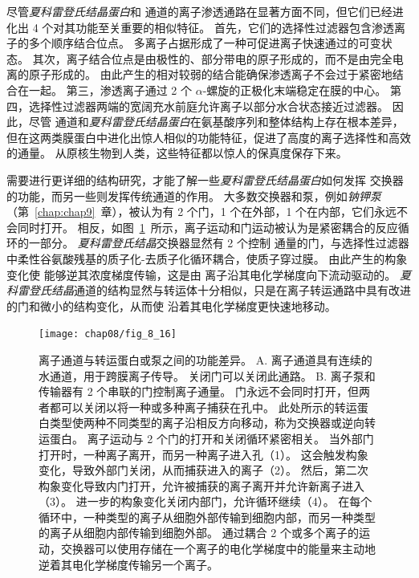 尽管\textit{夏科雷登氏结晶蛋白}和  通道的离子渗透通路在显著方面不同，但它们已经进化出 4 个对其功能至关重要的相似特征。
首先，它们的选择性过滤器包含渗透离子的多个顺序结合位点。
多离子占据形成了一种可促进离子快速通过的可变状态。
其次，离子结合位点是由极性的、部分带电的原子形成的，而不是由完全电离的原子形成的。
由此产生的相对较弱的结合能确保渗透离子不会过于紧密地结合在一起。
第三，渗透离子通过 2 个 $\alpha$-螺旋的正极化末端稳定在膜的中心。
第四，选择性过滤器两端的宽阔充水前庭允许离子以部分水合状态接近过滤器。
因此，尽管  通道和\textit{夏科雷登氏结晶蛋白}在氨基酸序列和整体结构上存在根本差异，但在这两类膜蛋白中进化出惊人相似的功能特征，促进了高度的离子选择性和高效的通量。 
从原核生物到人类，这些特征都以惊人的保真度保存下来。


需要进行更详细的结构研究，才能了解一些\textit{夏科雷登氏结晶蛋白}如何发挥  交换器的功能，而另一些则发挥传统通道的作用。
大多数交换器和泵，例如\textit{钠钾泵}（第~\ref{chap:chap9}~章），被认为有 2 个门，1 个在外部，1 个在内部，它们永远不会同时打开。
相反，如图~\ref{fig:8_16}~所示，离子运动和门运动被认为是紧密耦合的反应循环的一部分。
\textit{夏科雷登氏结晶}交换器显然有 2 个控制  通量的门，与选择性过滤器中柔性谷氨酸残基的质子化-去质子化循环耦合，使质子穿过膜。
由此产生的构象变化使  能够逆其浓度梯度传输，这是由  离子沿其电化学梯度向下流动驱动的。
\textit{夏科雷登氏结晶}通道的结构显然与转运体十分相似，只是在离子转运通路中具有改进的门和微小的结构变化，从而使  沿着其电化学梯度更快速地移动。


\begin{figure}[htbp]
	\centering
	\texttt{[image: chap08/fig\_8\_16]}
	\caption{离子通道与转运蛋白或泵之间的功能差异\cite{gadsby2004spot}。 
		A. 离子通道具有连续的水通道，用于跨膜离子传导。
		关闭门可以关闭此通路。
		B. 离子泵和传输器有 2 个串联的门控制离子通量。
		门永远不会同时打开，但两者都可以关闭以将一种或多种离子捕获在孔中。
		此处所示的转运蛋白类型使两种不同类型的离子沿相反方向移动，称为交换器或逆向转运蛋白。
		离子运动与 2 个门的打开和关闭循环紧密相关。
		当外部门打开时，一种离子离开，而另一种离子进入孔（1）。
		这会触发构象变化，导致外部门关闭，从而捕获进入的离子（2）。
		然后，第二次构象变化导致内门打开，允许被捕获的离子离开并允许新离子进入（3）。
		进一步的构象变化关闭内部门，允许循环继续（4）。
		在每个循环中，一种类型的离子从细胞外部传输到细胞内部，而另一种类型的离子从细胞内部传输到细胞外部。
		通过耦合 2 个或多个离子的运动，交换器可以使用存储在一个离子的电化学梯度中的能量来主动地逆着其电化学梯度传输另一个离子。}
	\label{fig:8_16}
\end{figure}



